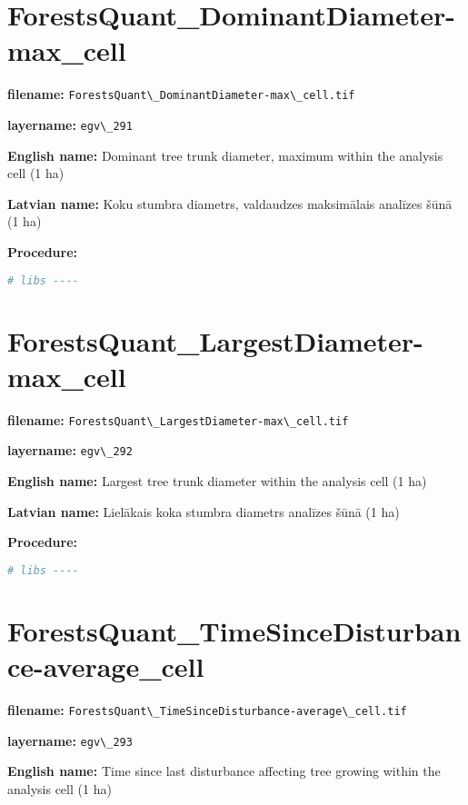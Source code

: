 \documentclass[
]{book}
\newcommand{\passthrough}[1]{#1}
\begin{document}
\section{ForestsQuant\_DominantDiameter-max\_cell}\label{ch06.291}

\textbf{filename:} \passthrough{\lstinline!ForestsQuant\_DominantDiameter-max\_cell.tif!}

\textbf{layername:} \passthrough{\lstinline!egv\_291!}

\textbf{English name:} Dominant tree trunk diameter, maximum within the analysis cell (1 ha)

\textbf{Latvian name:} Koku stumbra diametrs, valdaudzes maksimālais analīzes šūnā (1 ha)

\textbf{Procedure:}

\begin{lstlisting}[language=R]
# libs ----
\end{lstlisting}

\section{ForestsQuant\_LargestDiameter-max\_cell}\label{ch06.292}

\textbf{filename:} \passthrough{\lstinline!ForestsQuant\_LargestDiameter-max\_cell.tif!}

\textbf{layername:} \passthrough{\lstinline!egv\_292!}

\textbf{English name:} Largest tree trunk diameter within the analysis cell (1 ha)

\textbf{Latvian name:} Lielākais koka stumbra diametrs analīzes šūnā (1 ha)

\textbf{Procedure:}

\begin{lstlisting}[language=R]
# libs ----
\end{lstlisting}

\section{ForestsQuant\_TimeSinceDisturbance-average\_cell}\label{ch06.293}

\textbf{filename:} \passthrough{\lstinline!ForestsQuant\_TimeSinceDisturbance-average\_cell.tif!}

\textbf{layername:} \passthrough{\lstinline!egv\_293!}

\textbf{English name:} Time since last disturbance affecting tree growing within the analysis cell (1 ha)
\end{document}
